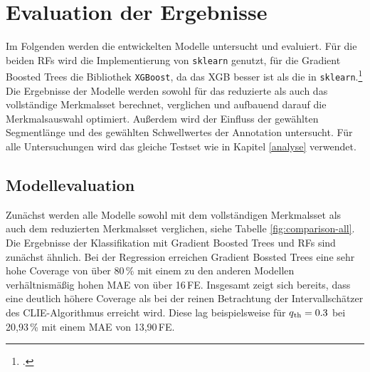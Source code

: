 \chapter{Evaluation der Ergebnisse}\label{evaluation}

Im Folgenden werden die entwickelten Modelle untersucht und evaluiert. Für die beiden \acl{RF}s wird die Implementierung von \texttt{sklearn} genutzt, für die Gradient Boosted Trees die Bibliothek \texttt{XGBoost}, da das \ac{XGB} besser ist als die in \texttt{sklearn}.\footcite[Kapitel 10]{Harrison2019} Die Ergebnisse der Modelle werden sowohl für das reduzierte als auch das vollständige Merkmalsset berechnet, verglichen und aufbauend darauf die Merkmalsauswahl optimiert. Außerdem wird der Einfluss der gewählten Segmentlänge und des gewählten Schwellwertes der Annotation untersucht. Für alle Untersuchungen wird das gleiche Testset wie in Kapitel \ref{analyse} verwendet.

\section{Modellevaluation} %

Zunächst werden alle Modelle sowohl mit dem vollständigen Merkmalsset als auch dem reduzierten Merkmalsset verglichen, siehe Tabelle \ref{fig:comparison-all}. Die Ergebnisse der Klassifikation mit Gradient Boosted Trees und \acl{RF}s sind zunächst ähnlich. Bei der Regression erreichen Gradient Bossted Trees eine sehr hohe Coverage von über 80\,\% mit einem zu den anderen Modellen verhältnismäßig hohen \ac{MAE} von über 16\,\si{FE}. Insgesamt zeigt sich bereits, dass eine deutlich höhere Coverage als bei der reinen Betrachtung der Intervallschätzer des CLIE-Algorithmus erreicht wird. Diese lag beispielsweise für $q\textsubscript{th} = 0.3$ bei 20,93\,\% mit einem \ac{MAE} von 13,90\,\si{FE}.

